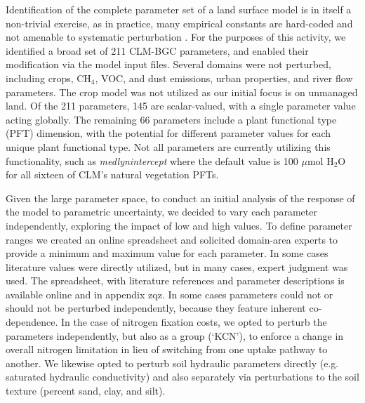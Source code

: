 \documentclass[draft]{agujournal2019}
\begin{document}
Identification of the complete parameter set of a land surface model is in itself a non-trivial exercise, as in practice, many empirical constants are hard-coded and not amenable to systematic perturbation \cite{mendoza2015,cuntz2016}. For the purposes of this activity, we identified a broad set of 211 CLM-BGC parameters, and enabled their modification via the model input files. Several domains were not perturbed, including crops, CH$_4$, VOC, and dust emissions, urban properties, and river flow parameters. The crop model was not utilized as our initial focus is on unmanaged land.
Of the 211 parameters, 145 are scalar-valued, with a single parameter value acting globally. The remaining 66 parameters include a plant functional type (PFT) dimension, with the potential for different parameter values for each unique plant functional type. Not all parameters are currently utilizing this functionality, such as \textit{medlynintercept} where the default value is 100 $\mu$mol H$_2$O for all sixteen of CLM's natural vegetation PFTs.

Given the large parameter space, to conduct an initial analysis of the response of the model to parametric uncertainty, we decided to vary each parameter independently, exploring the impact of low and high values. To define parameter ranges we created an online spreadsheet and solicited domain-area experts to provide a minimum and maximum value for each parameter. In some cases literature values were directly utilized, but in many cases, expert judgment was used. The spreadsheet, with literature references and parameter descriptions is available online and in appendix zqz. In some cases parameters could not or should not be perturbed independently, because they feature inherent co-dependence. In the case of nitrogen fixation costs, we opted to perturb the parameters independently, but also as a group (`KCN'), to enforce a change in overall nitrogen limitation in lieu of switching from one uptake pathway to another. We likewise opted to perturb soil hydraulic parameters directly (e.g. saturated hydraulic conductivity) and also separately via perturbations to the soil texture (percent sand, clay, and silt).
\end{document}
